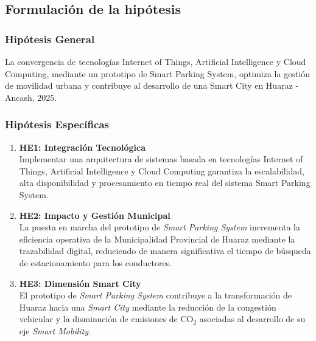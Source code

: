 \documentclass[12pt,a4paper]{article}
\begin{document}
\subsection{Formulación de la hipótesis}
\newcommand{\hipotesisGeneral}{La convergencia de tecnologías Internet of Things, Artificial Intelligence y Cloud Computing, mediante un prototipo de Smart Parking System, optimiza la gestión de movilidad urbana y contribuye al desarrollo de una Smart City en Huaraz - Ancash, 2025.}

\newcommand{\hipotesisEspecificoUno}{Implementar una  arquitectura de sistemas basada en tecnologías Internet of Things, Artificial Intelligence y Cloud Computing garantiza la escalabilidad, alta disponibilidad y procesamiento en tiempo real del sistema Smart Parking System.}

\newcommand{\hipotesisEspecificoDos}{La puesta en marcha del prototipo de \textit{Smart Parking System} incrementa la eficiencia operativa de la Municipalidad Provincial de Huaraz mediante la trazabilidad digital, reduciendo de manera significativa el tiempo de búsqueda de estacionamiento para los conductores.}

\newcommand{\hipotesisEspecificoTres}{El prototipo de \textit{Smart Parking System} contribuye a la transformación de Huaraz hacia una \textit{Smart City} mediante la reducción de la congestión vehicular y la disminución de emisiones de CO$_2$ asociadas al desarrollo de su eje \textit{Smart Mobility}.}

\subsubsection{Hipótesis General}
\hipotesisGeneral{}

\subsubsection{Hipótesis Específicas}
\begin{enumerate}
	\item \textbf{HE1: Integración Tecnológica}\\
	\hipotesisEspecificoUno{}
	
	\item \textbf{HE2: Impacto y Gestión Municipal}\\
	\hipotesisEspecificoDos{}
	
	\item \textbf{HE3: Dimensión Smart City}\\
	\hipotesisEspecificoTres{}
\end{enumerate}
\end{document}
